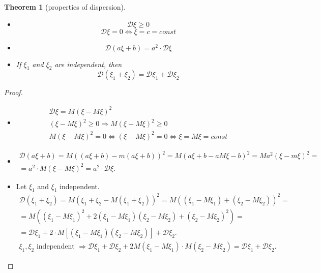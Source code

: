 \documentclass[12pt,letterpaper]{report}
\newtheorem{theorem}{Theorem}[section]
\begin{document}
\begin{theorem}[properties of dispersion]
    \begin{itemize}
        \item[1.] \[ \mathcal{D}\xi \geq 0 \]
            \[ \mathcal{D}\xi = 0 \iff \xi = c = const \]
        \item[2.] \[ \mathcal{D}(a\xi + b) = a^2 \cdot \mathcal{D}\xi \]
        \item[3.] If $\xi_1$ and $\xi_2$ are independent, then 
            \[ \mathcal{D}(\xi_1 + \xi_2) = \mathcal{D}\xi_1 + \mathcal{D}\xi_2 \]
    \end{itemize}
\end{theorem}

\begin{proof}
    \begin{itemize}
        \item[1.]
        \begin{gather*}
                \mathcal{D}\xi = M(\xi - M\xi)^2 \\
                (\xi - M\xi)^2 \geq 0 \Rightarrow M(\xi -M\xi)^2 \geq 0 \\
                M(\xi-M\xi)^2 = 0 \iff (\xi-M\xi)^2 = 0 \iff \xi = M\xi = const
        \end{gather*}
    \item[2.] 
        \begin{gather*}
            \mathcal{D}(a\xi+b) = M((a\xi + b) - m(a\xi+b))^2 = M(a\xi + b - aM\xi -b)^2 = M a^2(\xi-m\xi)^2 = \\
            = a^2 \cdot M(\xi - M\xi)^2 = a^2 \cdot \mathcal{D}\xi.
        \end{gather*}
    \item[3.]
        Let $\xi_1$ and $\xi_1$ independent.
        \begin{gather*}
            \mathcal{D}(\xi_1 + \xi_2) = M(\xi_1 + \xi_2 - M(\xi_1 + \xi_2))^2 = 
            M((\xi_1 - M\xi_1) + (\xi_2 - M\xi_2))^2 = \\
            = M((\xi_1 -M\xi_1)^2 + 2(\xi_1-M\xi_1)(\xi_2-M\xi_2) + (\xi_2-M\xi_2)^2) = \\
            = \mathcal{D}\xi_1 + 2\cdot M[(\xi_1 -M\xi_1)(\xi_2-M\xi_2)] + \mathcal{D}\xi_2. \\
            \text{$\xi_1, \xi_2$ independent } \Rightarrow \mathcal{D}\xi_1 +
            \mathcal{D}\xi_2 + 2M(\xi_1-M\xi_1) \cdot M(\xi_2 -M\xi_2) = \mathcal{D}\xi_1 + \mathcal{D}\xi_2.
        \end{gather*}
    \end{itemize}
\end{proof}
\end{document}
